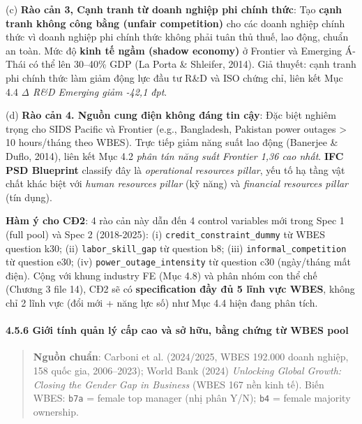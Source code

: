 \documentclass[12pt,a4paper]{article}
\begin{document}
(c) \textbf{Rào cản 3, Cạnh tranh từ doanh nghiệp phi chính thức}: Tạo
\textbf{cạnh tranh không công bằng (unfair competition)} cho các doanh
nghiệp chính thức vì doanh nghiệp phi chính thức không phải tuân thủ
thuế, lao động, chuẩn an toàn. Mức độ \textbf{kinh tế ngầm (shadow
economy)} ở Frontier và Emerging Á-Thái có thể lên 30--40\% GDP (La
Porta \& Shleifer, 2014). Giả thuyết: cạnh tranh phi chính thức làm giảm
động lực đầu tư R\&D và ISO chứng chỉ, liên kết Mục 4.4 \emph{Δ R\&D
Emerging giảm -42,1 đpt}.

(d) \textbf{Rào cản 4. Nguồn cung điện không đáng tin cậy}: Đặc biệt
nghiêm trọng cho SIDS Pacific và Frontier (e.g., Bangladesh, Pakistan
power outages \textgreater{} 10 hours/tháng theo WBES). Trực tiếp giảm
năng suất lao động (Banerjee \& Duflo, 2014), liên kết Mục 4.2
\emph{phân tán năng suất Frontier 1,36 cao nhất}. \textbf{IFC PSD
Blueprint} classify đây là \emph{operational resources pillar}, yếu tố
hạ tầng vật chất khác biệt với \emph{human resources pillar} (kỹ năng)
và \emph{financial resources pillar} (tín dụng).

\textbf{Hàm ý cho CĐ2}: 4 rào cản này dẫn đến 4 control variables mới
trong Spec 1 (full pool) và Spec 2 (2018-2025): (i)
\texttt{credit\_constraint\_dummy} từ WBES question k30; (ii)
\texttt{labor\_skill\_gap} từ question b8; (iii)
\texttt{informal\_competition} từ question e30; (iv)
\texttt{power\_outage\_intensity} từ question c30 (ngày/tháng mất điện).
Cộng với khung industry FE (Mục 4.8) và phân nhóm con thể chế (Chương 3
file 14), CĐ2 sẽ có \textbf{specification đầy đủ 5 lĩnh vực WBES}, không
chỉ 2 lĩnh vực (đổi mới + năng lực số) như Mục 4.4 hiện đang phân tích.

\hypertarget{456-giux1edbi-tuxednh-quux1ea3n-luxfd-cux1ea5p-cao-vuxe0-sux1edf-hux1eefu-bux1eb1ng-chux1ee9ng-tux1eeb-wbes-pool}{%
\paragraph{4.5.6 Giới tính quản lý cấp cao và sở hữu, bằng chứng từ WBES
pool}\label{456-giux1edbi-tuxednh-quux1ea3n-luxfd-cux1ea5p-cao-vuxe0-sux1edf-hux1eefu-bux1eb1ng-chux1ee9ng-tux1eeb-wbes-pool}}

\begin{quote}
\textbf{Nguồn chuẩn}: Carboni et al. (2024/2025, WBES 192.000 doanh
nghiệp, 158 quốc gia, 2006--2023); World Bank (2024) \emph{Unlocking
Global Growth: Closing the Gender Gap in Business} (WBES 167 nền kinh
tế). Biến WBES: \texttt{b7a} = female top manager (nhị phân Y/N);
\texttt{b4} = female majority ownership.
\end{quote}
\end{document}
